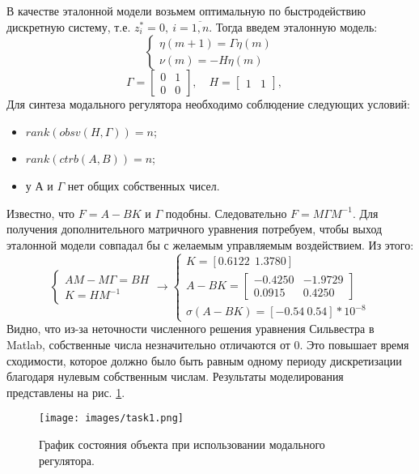 \documentclass[a4paper, 14pt]{extarticle}
\theoremstyle{definition}
\theoremstyle{plain}
\theoremstyle{remark}
\begin{document}
В качестве эталонной модели возьмем оптимальную по быстродействию дискретную систему, т.е. \(z_i^* = 0,~i=\overline{1,n}\).
Тогда введем эталонную модель:
\[
	\begin{cases}
		\eta(m+1) = \Gamma \eta(m) \\
		\nu(m) = -H \eta(m)
	\end{cases}
\]
\[
	\Gamma = \begin{bmatrix} 0 & 1 \\ 0 & 0 \end{bmatrix}, \quad
	H = \begin{bmatrix} 1 & 1 \end{bmatrix}, \quad
\]
Для синтеза модального регулятора необходимо соблюдение следующих условий:
\begin{itemize}
	\item \(rank(obsv(H, \Gamma)) = n\);
	\item \(rank(ctrb(A, B)) = n\);
	\item у А и \(\Gamma\) нет общих собственных чисел.
\end{itemize}

Известно, что \(F = A - BK\) и \(\Gamma\) подобны. Следовательно \(F = M \Gamma M^{-1}\). Для получения дополнительного матричного уравнения потребуем, чтобы выход эталонной модели совпадал бы с желаемым управляемым воздействием.
Из этого:
\[
	\begin{cases}
		AM - M \Gamma = BH \\
		K = HM^{-1}
	\end{cases} \rightarrow
	\begin{cases}
		K = [0.6122~~1.3780]\\
		A - BK = \begin{bmatrix}
			-0.4250 & -1.9729 \\
			0.0915 & 0.4250
			\end{bmatrix} \\
		\sigma(A - BK) = [-0.54 ~ 0.54]*10^{-8}
	\end{cases} 
\]
Видно, что из-за неточности численного решения уравнения Сильвестра в Matlab, собственные числа незначительно отличаются от 0. Это повышает время сходимости, которое должно было быть равным одному периоду дискретизации благодаря нулевым собственным числам. Результаты моделирования представлены на рис. \ref{fig:task1}.
\begin{figure}
	[H]
	\centering
	\texttt{[image: images/task1.png]}
	\caption{График состояния объекта при использовании модального регулятора.}
	\label{fig:task1}
\end{figure}
\end{document}
